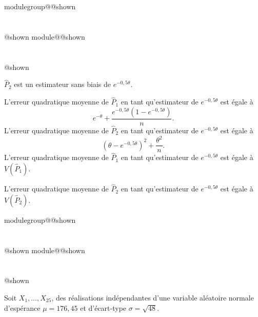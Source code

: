 \documentclass{Evaluation}
\makeatletter
\newcommand{\currentmodulekey}{}
\newcommand{\currentmoduletitle}{}
\newcommand{\currentgroupkey}{}
\newcommand{\currentgrouptitle}{}
\newcommand{\showmoduleifneeded}{%
  \ifx\currentgroupkey\empty\else
    \expandafter\ifx\csname modulegroup@\currentgroupkey @shown\endcsname\relax
      \section*{\currentgrouptitle}%
      \expandafter\gdef\csname modulegroup@\currentgroupkey @shown\endcsname{1}%
    \fi
  \fi
  \expandafter\ifx\csname module@\currentmodulekey @shown\endcsname\relax
    \section*{\currentmoduletitle}%
    \expandafter\gdef\csname module@\currentmodulekey @shown\endcsname{1}%
  \fi
}
\newenvironment{A25}{\showmoduleifneeded}{}
\makeatother
\begin{document}
\begin{questions}
\begin{A25}
\begin{checkboxes}
\choice $\hat{P}_2$ est un estimateur sans biais de $e^{-0,5\theta}$.

\choice L'erreur quadratique moyenne de $\hat{P}_1$ en tant qu'estimateur de $e^{-0,5\theta}$ est égale à
$$e^{-\theta}+\frac{e^{-0,5\theta}\left(1-e^{-0,5\theta}\right)}{n}.$$
    \correctchoice L'erreur quadratique moyenne de $\hat{P}_2$ en tant qu'estimateur de $e^{-0,5\theta}$
est égale à
$$\left(\theta-e^{-0,5\theta}\right)^2+\frac{\theta^2}{n}.$$
\correctchoice L'erreur quadratique moyenne de $\hat{P}_1$ en tant qu'estimateur de $e^{-0,5\theta}$ est égale à
$V(\hat{P}_1)$.

\choice L'erreur quadratique moyenne de $\hat{P}_2$ en tant qu'estimateur de $e^{-0,5\theta}$ est égale à
$V(\hat{P}_2)$.
\end{checkboxes}
\end{A25}

\begin{A25}
\question {} %
Soit $X_1,\hdots,X_{25}$, des réalisations indépendantes d'une variable aléatoire normale d'espérance $\mu=176,45$ et d'écart-type $\sigma=\sqrt{48}$.

\end{A25}
\end{questions}
\end{document}
